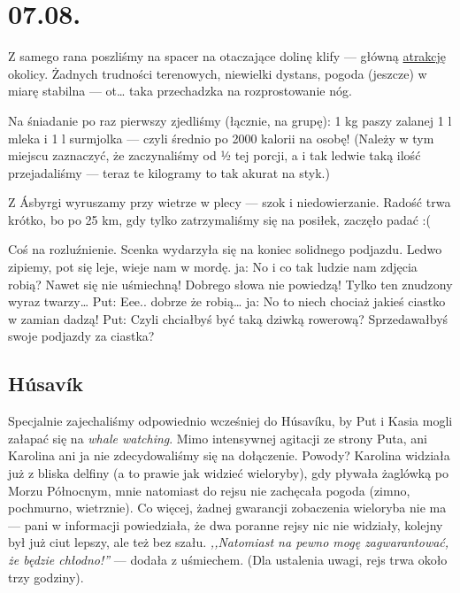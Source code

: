 \chapter*{07.08.}

Z samego rana poszliśmy na spacer na otaczające dolinę klify --- główną \href{http://www.visithusavik.com/attractions/asbyrgi-canyon/}{atrakcję} okolicy. Żadnych trudności terenowych, niewielki dystans, pogoda (jeszcze) w miarę stabilna --- ot… taka przechadzka na rozprostowanie nóg.

Na śniadanie po raz pierwszy zjedliśmy (łącznie, na grupę): 1 kg paszy zalanej 1 l mleka i 1 l surmjolka --- czyli średnio po 2000 kalorii na osobę! (Należy w tym miejscu zaznaczyć, że zaczynaliśmy od ½ tej porcji, a i tak ledwie taką ilość przejadaliśmy --- teraz te kilogramy to tak akurat na styk.)


Z Ásbyrgi wyruszamy przy wietrze w plecy --- szok i niedowierzanie. Radość trwa krótko, bo po 25 km, gdy tylko zatrzymaliśmy się na posiłek, zaczęło padać :(

Coś na rozluźnienie. Scenka wydarzyła się na koniec solidnego podjazdu. Ledwo zipiemy, pot się leje, wieje nam w mordę.
ja: No i co tak ludzie nam zdjęcia robią? Nawet się nie uśmiechną! Dobrego słowa nie powiedzą! Tylko ten znudzony wyraz twarzy…
Put: Eee.. dobrze że robią…
ja: No to niech chociaż jakieś ciastko w zamian dadzą!
Put: Czyli chciałbyś być taką dziwką rowerową? Sprzedawałbyś swoje podjazdy za ciastka?

\section*{Húsavík}

Specjalnie zajechaliśmy odpowiednio wcześniej do Húsavíku, by Put i Kasia mogli załapać się na \emph{whale watching}. Mimo intensywnej agitacji ze strony Puta, ani Karolina ani ja nie zdecydowaliśmy się na dołączenie. Powody? Karolina widziała już z bliska delfiny (a to prawie jak widzieć wieloryby), gdy pływała żaglówką po Morzu Północnym, mnie natomiast do rejsu nie zachęcała pogoda (zimno, pochmurno, wietrznie). Co więcej, żadnej gwarancji zobaczenia wieloryba nie ma --- pani w informacji powiedziała, że dwa poranne rejsy nic nie widziały, kolejny był już ciut lepszy, ale też bez szału. \emph{,,Natomiast na pewno mogę zagwarantować, że będzie chłodno!''} --- dodała z uśmiechem. (Dla ustalenia uwagi, rejs trwa około trzy godziny).

